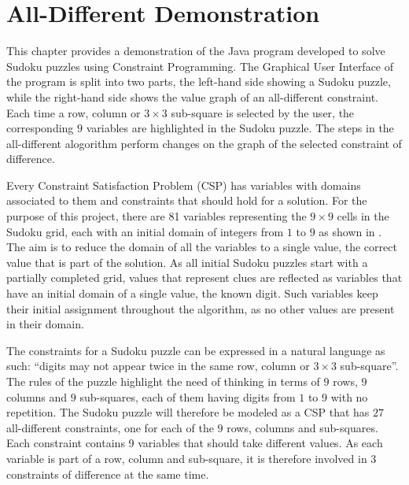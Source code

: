 \documentclass{l4proj}
\begin{document}
\chapter{All-Different Demonstration}
\label{chap5alldiffdemo}

\noindent This chapter provides a demonstration of the Java program developed to solve Sudoku puzzles using Constraint Programming. The Graphical User Interface of the program is split into two parts, the left-hand side showing a Sudoku puzzle, while the right-hand side shows the value graph of an all-different constraint. Each time a row, column or $3 \times 3$ sub-square is selected by the user, the corresponding $9$ variables are highlighted in the Sudoku puzzle. The steps in the all-different alogorithm perform changes on the graph of the selected constraint of difference.

\noindent Every Constraint Satisfaction Problem (CSP) has variables with domains associated to them and constraints that should hold for a solution. For the purpose of this project, there are 81 variables representing the $9 \times 9$ cells in the Sudoku grid, each with an initial domain of integers from $1$ to $9$ as shown in . The aim is to reduce the domain of all the variables to a single value, the correct value that is part of the solution. As all initial Sudoku puzzles start with a partially completed grid, values that represent clues are reflected as variables that have an initial domain of a single value, the known digit. Such variables keep their initial assignment throughout the algorithm, as no other values are present in their domain.

\noindent The constraints for a Sudoku puzzle can be expressed in a natural language as such: ``digits may not appear twice in the same row, column or $3\times 3$ sub-square''. The rules of the puzzle highlight the need of thinking in terms of $9$ rows, $9$ columns and $9$ sub-squares, each of them having digits from $1$ to $9$ with no repetition. The Sudoku puzzle will therefore be modeled as a CSP \cite{simonis2005sudoku} that has $27$ all-different constraints, one for each of the $9$ rows, columns and sub-squares. Each constraint contains 9 variables that should take different values. As each variable is part of a row, column and sub-square, it is therefore involved in 3 constraints of difference at the same time.
\end{document}
